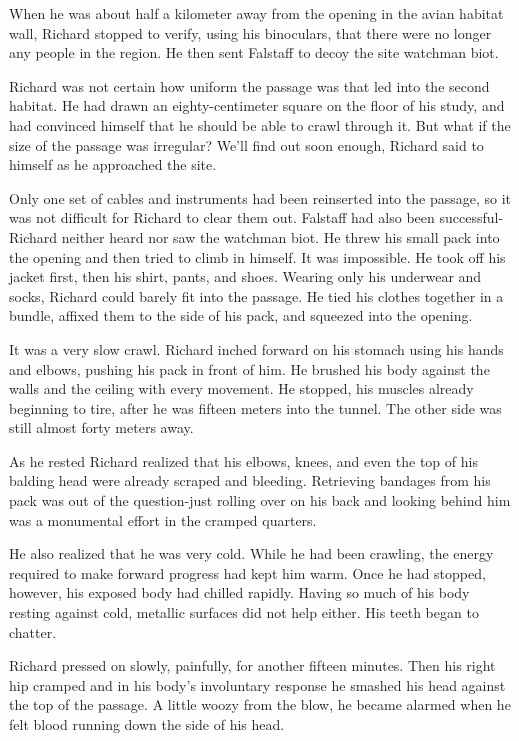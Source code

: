 \documentclass[]{article}
\begin{document}
{When he was about half a kilometer away from the opening in the avian habitat wall, Richard stopped to verify, using his binoculars, that there were no longer any people in the region. He then sent Falstaff to decoy the site watchman biot.

Richard was not certain how uniform the passage was that led into the second habitat. He had drawn an eighty-centimeter square on the floor of his study, and had convinced himself that he should be able to crawl through it. But what if the size of the passage was irregular? We’ll find out soon enough, Richard said to himself as he approached the site.

Only one set of cables and instruments had been reinserted into the passage, so it was not difficult for Richard to clear them out. Falstaff had also been successful-Richard neither heard nor saw the watchman biot. He threw his small pack into the opening and then tried to climb in himself. It was impossible. He took off his jacket first, then his shirt, pants, and shoes. Wearing only his underwear and socks, Richard could barely fit into the passage. He tied his clothes together in a bundle, affixed them to the side of his pack, and squeezed into the opening.

It was a very slow crawl. Richard inched forward on his stomach using his hands and elbows, pushing his pack in front of him. He brushed his body against the walls and the ceiling with every movement. He stopped, his muscles already beginning to tire, after he was fifteen meters into the tunnel. The other side was still almost forty meters away.

As he rested Richard realized that his elbows, knees, and even the top of his balding head were already scraped and bleeding. Retrieving bandages from his pack was out of the question-just rolling over on his back and looking behind him was a monumental effort in the cramped quarters.

He also realized that he was very cold. While he had been crawling, the energy required to make forward progress had kept him warm. Once he had stopped, however, his exposed body had chilled rapidly. Having so much of his body resting against cold, metallic surfaces did not help either. His teeth began to chatter.

Richard pressed on slowly, painfully, for another fifteen minutes. Then his right hip cramped and in his body’s involuntary response he smashed his head against the top of the passage. A little woozy from the blow, he became alarmed when he felt blood running down the side of his head.

}
\end{document}
